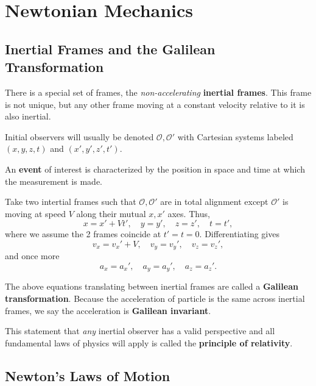 \chapter{Newtonian Mechanics}

\section{Inertial Frames and the Galilean Transformation}

\begin{definition}
    There is a special set of frames, the \emph{non-accelerating} \textbf{inertial frames}. This frame is not unique, but any other frame moving at a constant velocity relative to it is also inertial.
\end{definition}
\begin{remark}
    Initial observers will usually be denoted $\mathscr{O}, \mathscr{O}'$ with Cartesian systems labeled $(x,y,z,t)$ and $(x',y',z',t')$.
\end{remark}
\begin{definition}[Event]
    An \textbf{event} of interest is characterized by the position in space and time at which the measurement is made.
\end{definition}
\begin{example}
    Take two intertial frames such that $\mathscr{O}, \mathscr{O'}$ are in total alignment except $\mathscr{O'}$ is moving at speed $V$ along their mutual $x,x'$ axes. Thus, $$x = x'+Vt', \quad y=y', \quad z=z', \quad t=t',$$ where we assume the 2 frames coincide at $t'=t=0$. Differentiating gives $$v_x = v_x'+V, \quad v_y = v_y', \quad v_z=v_z',$$ and once more $$a_x=a_x', \quad a_y=a_y', \quad a_z=a_z'.$$
\end{example}
\begin{definition}
    The above equations translating between inertial frames are called a \textbf{Galilean transformation}. Because the acceleration of particle is the same across inertial frames, we say the acceleration is \textbf{Galilean invariant}.
\end{definition}
\begin{remark}
    This statement that \emph{any} inertial observer has a valid perspective and all fundamental laws of physics will apply is called the \textbf{principle of relativity}.
\end{remark}

\section{Newton's Laws of Motion}

